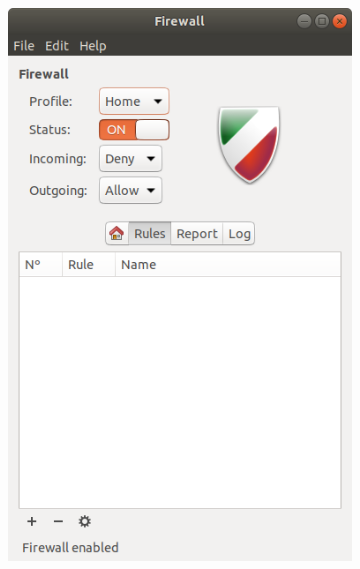 \documentclass[
	a4paper,
	oneside,
	BCOR = 10mm,
	DIV = 12,
	12pt,
	headings = normal,
]{scrartcl}
\newlength{\gridunitwidth}
\begin{document}
\begin{figure}[!htbp]
\begin{subfigure}[b]{3 \gridunitwidth - 1em / 4}
				\includegraphics[width = \columnwidth]{./assets/02.png}
				\caption{}
				\label{subfig:01-02}
			\end{subfigure}%
			\hspace{0.333333em}%
			\begin{subfigure}[b]{3 \gridunitwidth - 1em / 4}

\end{subfigure}
\end{figure}
\end{document}
